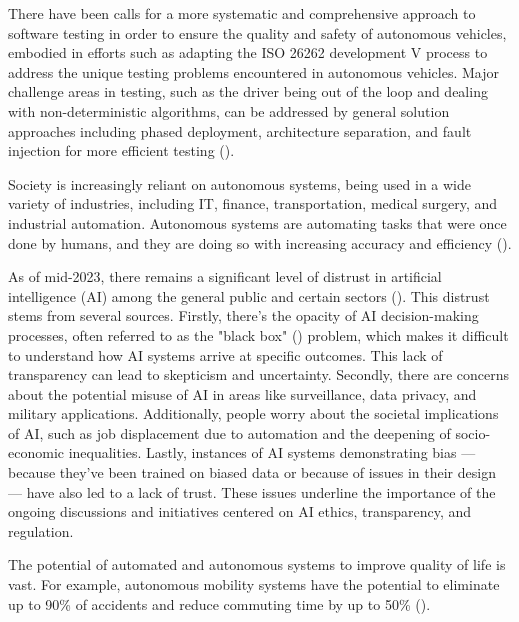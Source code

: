

There have been calls for a more systematic and comprehensive approach to software testing in order to ensure the quality and safety of autonomous vehicles, embodied in efforts such as adapting the ISO 26262 development V process to address the unique testing problems encountered in autonomous vehicles. Major challenge areas in testing, such as the driver being out of the loop and dealing with non-deterministic algorithms, can be addressed by general solution approaches including phased deployment, architecture separation, and fault injection for more efficient testing (\cite{koopman2016challenges}).

Society is increasingly reliant on autonomous systems,  being used in a wide variety of industries, including IT, finance, transportation, medical surgery, and industrial automation. Autonomous systems are automating tasks that were once done by humans, and they are doing so with increasing accuracy and efficiency (\cite{ebert2019validation}).



As of mid-2023, there remains a significant level of distrust in artificial intelligence (AI) among the general public and certain sectors (\cite{futureoflife2023pausegiantai}). This distrust stems from several sources. Firstly, there's the opacity of AI decision-making processes, often referred to as the "black box" (\cite{burrell2016}) problem, which makes it difficult to understand how AI systems arrive at specific outcomes. This lack of transparency can lead to skepticism and uncertainty. Secondly, there are concerns about the potential misuse of AI in areas like surveillance, data privacy, and military applications. Additionally, people worry about the societal implications of AI, such as job displacement due to automation and the deepening of socio-economic inequalities. Lastly, instances of AI systems demonstrating bias — because they've been trained on biased data or because of issues in their design — have also led to a lack of trust. These issues underline the importance of the ongoing discussions and initiatives centered on AI ethics, transparency, and regulation.

The potential of automated and autonomous systems to improve quality of life is vast. For example, autonomous mobility systems have the potential to eliminate up to 90\% of accidents and reduce commuting time by up to 50\% (\cite{kalra2016driving}).

